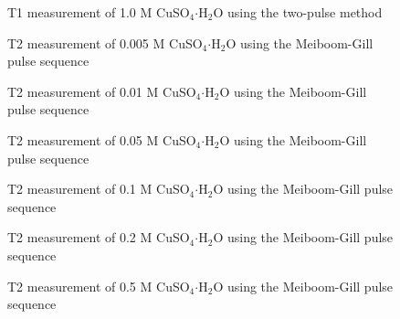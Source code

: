 \documentclass[
reprint,
amsmath,amssymb,
aps,
tikz,
border=5pt
]{revtex4-1}
\begin{document}
  \begin{figure}[h]
    \resizebox{0.45\textwidth}{!}{}
    \caption{T1 measurement of 1.0 M  CuSO$_{4} \boldsymbol{\cdot} $H$_2$O using the two-pulse method }
    \label{fig:1d0_t1}
  \end{figure}



  \begin{figure}[h]
    \resizebox{0.45\textwidth}{!}{}
    \caption{T2 measurement of 0.005 M CuSO$_{4} \boldsymbol{\cdot} $H$_2$O using the Meiboom-Gill pulse sequence }
    \label{fig:0d005_t2}
  \end{figure}

  \begin{figure}[h]
    \resizebox{0.45\textwidth}{!}{}
    \caption{T2 measurement of 0.01 M CuSO$_{4} \boldsymbol{\cdot} $H$_2$O using the Meiboom-Gill pulse sequence }
    \label{fig:0d01_t2}
  \end{figure}

  \begin{figure}[h]
    \resizebox{0.45\textwidth}{!}{}
    \caption{T2 measurement of 0.05 M CuSO$_{4} \boldsymbol{\cdot} $H$_2$O using the Meiboom-Gill pulse sequence }
    \label{fig:0d05_t2}
  \end{figure}

  \begin{figure}[h]
    \resizebox{0.45\textwidth}{!}{}
    \caption{T2 measurement of 0.1 M CuSO$_{4} \boldsymbol{\cdot} $H$_2$O using the Meiboom-Gill pulse sequence }
    \label{fig:0d1_t2}
  \end{figure}

  \begin{figure}[h]
    \resizebox{0.45\textwidth}{!}{}
    \caption{T2 measurement of 0.2 M CuSO$_{4} \boldsymbol{\cdot} $H$_2$O using the Meiboom-Gill pulse sequence }
    \label{fig:0d2_t2}
  \end{figure}

  \begin{figure}[h]
    \resizebox{0.45\textwidth}{!}{}
    \caption{T2 measurement of 0.5 M CuSO$_{4} \boldsymbol{\cdot} $H$_2$O using the Meiboom-Gill pulse sequence }
    \label{fig:0d5_t2}
  \end{figure}
\end{document}
